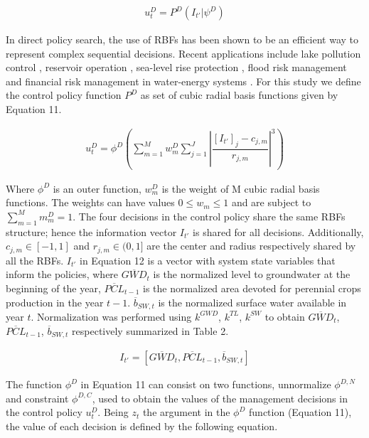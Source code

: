 \documentclass[a4paper,fleqn]{cas-sc}
\begin{document}
\begin{align}
u_{t}^D = P^{D}(I_{t'}|\psi^{D})
\end{align}

In direct policy search, the use of RBFs has been shown to be an efficient way to represent complex sequential decisions. Recent applications include lake pollution control \citep{quinn_direct_2017}, reservoir operation \citep{giuliani_universal_2014, zatarain_salazar_balancing_2017,giuliani_state---art_2021}, sea-level rise protection \citep{garner_using_2018}, flood risk management \cite{wang} and financial risk management in water-energy systems \citep{gupta_can_2020,hamilton_stream_2022}. For this study we define the control policy function $P^D$ as set of cubic radial basis functions given by Equation 11.

\begin{align}
u_{t}^D = \phi^{D}\left(\sum_{m=1}^M w_{m}^D \sum_{j=1}^J \left\lvert\dfrac{[I_{t'}]_{j}-c_{j,m}}{r_{j,m}}\right\rvert^{3}\right)
\end{align}

Where $\phi^{D}$ is an outer function, $w_{m}^D$ is the weight of M cubic radial basis functions. The weights can have values $ 0 \leq w_{m} \leq 1$ and are subject to $\sum_{m=1}^M m_{m}^D= 1$. The four decisions in the control policy share the same RBFs structure; hence the information vector $I_{t'}$ is shared for all decisions. Additionally, $c_{j,m} \in [-1,1]$ and $r_{j,m} \in (0,1]$ are the center and radius respectively shared by all the RBFs. $I_{t'}$ in Equation 12 is a vector with system state variables that inform the policies, where $\overline{GWD}_{t}$ is the normalized level to groundwater at the beginning of the year, $\overline{PCL}_{t-1}$ is the normalized area devoted for perennial crops production in the year $t-1$. $\overline{b}_{SW,t}$ is the normalized surface water available in year $t$. Normalization was performed using $k^{GWD}$, $k^{TL}$, $k^{SW}$ to obtain $\overline{GWD}_{t}$, $\overline{PCL}_{t-1}$, $\overline{b}_{SW,t}$ respectively summarized in Table 2.

\begin{align}
I_{t'} = [\overline{GWD}_{t},\overline{PCL}_{t-1},\overline{b}_{SW,t}]
\end{align}

The function $\phi^{D}$ in Equation 11 can consist on two functions, unnormalize $\phi^{D,N}$ and constraint $\phi^{D,C}$, used to obtain the values of the management decisions in the control policy $u_{t}^D$. Being $z_{t}$ the argument in the $\phi^{D}$ function (Equation 11), the value of each decision is defined by the following equation.
\end{document}

